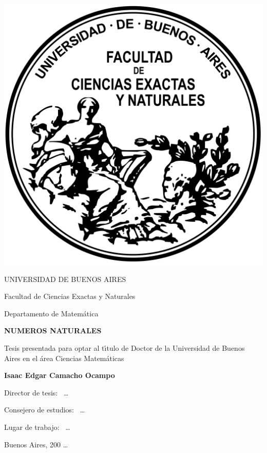 \documentclass[12pt]{book}
\begin{document}
\thispagestyle{empty}

\begin {center}

\includegraphics[scale=.3]{Logo-fcenuba.png}

\medskip
UNIVERSIDAD DE BUENOS AIRES

Facultad de Ciencias Exactas y Naturales

Departamento de Matem\'atica


\vspace{3cm}


\textbf{\large NUMEROS NATURALES}

\vspace{2cm}


Tesis presentada para optar al t\'\i tulo de Doctor de la Universidad de Buenos Aires en el \'area Ciencias Matem\'aticas

\vspace{2cm}

\textbf{Isaac Edgar Camacho Ocampo}

\end {center}


\vspace{1.5cm}

\noindent Director de tesis: \ \dots
 
\noindent Consejero de estudios: \ \dots

\vspace{1cm}

\noindent Lugar de trabajo: \ \dots

\vspace{1cm}

\noindent Buenos Aires, 200 \dots
\end{document}
